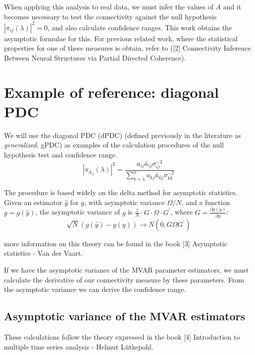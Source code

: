 \documentclass[a4paper,10pt]{article}
\begin{document}
When applying this analysis to real data, we must infer the values of $A$ and it becomes necessary to test the connectivity against the null hypothesis $ |\pi_{ij}(\lambda)|^{2} = 0$, and also calculate confidence ranges. This work obtains the asymptotic formulae for this. For previous related work, where the statistical properties for one of these measures is obtain, refer to ([2] Connectivity Inference Between Neural Structures via Partial Directed Coherence).

\section{Example of reference: diagonal PDC}

We will use the diagonal PDC (dPDC) (defined previously in the literature as \emph{generalized}, gPDC) as examples of the calculation procedures of the null hypothesis test and confidence range.
\begin{equation}
|\pi_{d_{ij}}(\lambda)|^{2} = \frac{a_{ij} \bar{a}_{ij} \sigma_{ij}^{-2}} {\sum_{k=1}^{n}{a_{kj} \bar{a}_{kj} \sigma_{kk}^{-2}}}
\end{equation}

The procedure is based widely on the delta method for asymptotic statistics. Given an estimator $\hat{y}$ for $y$, with asymptotic variance $\Omega/N$, and a function $g = g(\hat{y})$, the asymptotic variance of $g$ is $\frac{1}{N} \cdot G \cdot \Omega \cdot G^{'}$, where $G = \frac{\partial g(y)}{\partial y}$:
\begin{equation} 
\sqrt{N} (g(\hat{y}) - g(y)) \to N(0, G \Omega G^{'})
\end{equation}

more information on this theory can be found in the book [3] Asymptotic statistics - Van der Vaart.

If we have the asymptotic variance of the MVAR parameter estimators, we must calculate the derivative of our connectivity measure by these parameters. From the asymptotic variance we can derive the confidence range.

\subsection{Asymptotic variance of the MVAR estimators}

These calculations follow the theory expressed in the book [4] Introduction to multiple time series analysis - Helmut Lütkepohl.
\end{document}
